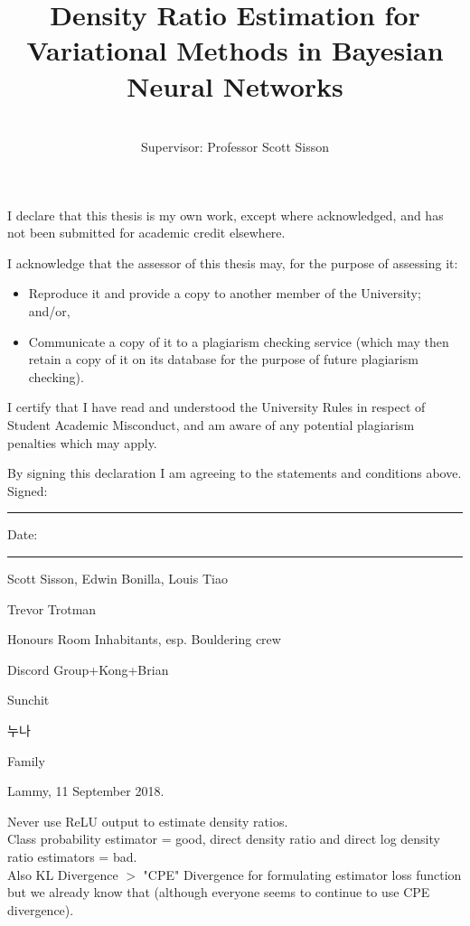 \documentclass[honours,12pt]{unswthesis}
\title{Density Ratio Estimation for Variational Methods in Bayesian Neural Networks}
\author{\Authornameonly\\{\bigskip}Supervisor: Professor Scott Sisson}
\newcommand\blankpage{%
    \null
    \thispagestyle{empty}%
    \addtocounter{page}{-1}%
    \newpage}
\numberwithin{equation}{section}
\theoremstyle{definition}
\begin{document}
\beforepreface

\afterpage{\blankpage}



\vskip 10pc \noindent I declare that this thesis is my
own work, except where acknowledged, and has not been submitted for
academic credit elsewhere. 

\vskip 2pc  \noindent I acknowledge that the assessor of this
thesis may, for the purpose of assessing it:
\begin{itemize}
\item Reproduce it and provide a copy to another member of the University; and/or,
\item Communicate a copy of it to a plagiarism checking service (which may then retain a copy of it on its database for the purpose of future plagiarism checking).
\end{itemize}

\vskip 2pc \noindent I certify that I have read and understood the University Rules in
respect of Student Academic Misconduct, and am aware of any potential plagiarism penalties which may 
apply.\vspace{24pt}

\vskip 2pc \noindent By signing 
this declaration I am
agreeing to the statements and conditions above.
\vskip 2pc \noindent
Signed: \rule{7cm}{0.25pt} \hfill Date: \rule{4cm}{0.25pt} \newline
\vskip 1pc

\afterpage{\blankpage}




{\bigskip}Scott Sisson, Edwin Bonilla, Louis Tiao

{\bigskip\noindent}Trevor Trotman

{\bigskip\noindent}Honours Room Inhabitants, esp. Bouldering crew

{\bigskip\noindent}Discord Group+Kong+Brian

{\bigskip\noindent}Sunchit

{\bigskip\noindent}누나

{\bigskip\noindent}Family

{\bigskip\bigskip\bigskip\noindent} Lammy, 11 September 2018.

\afterpage{\blankpage}


Never use ReLU output to estimate density ratios.\\
Class probability estimator = good, direct density ratio and direct log density ratio estimators = bad.\\ 
Also KL Divergence $>$ "CPE" Divergence for formulating estimator loss function but we already know that (although everyone seems to continue to use CPE divergence).
\afterpage{\blankpage}
\end{document}
